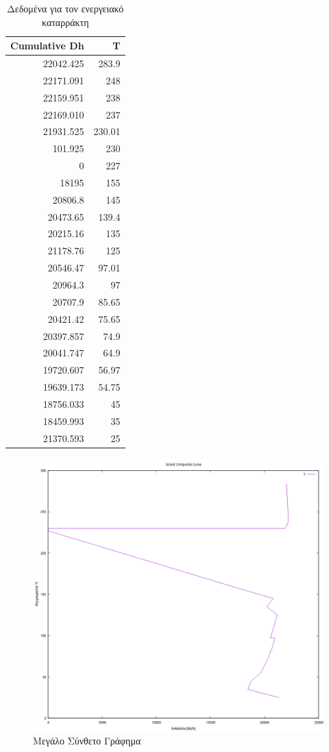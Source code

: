 \documentclass[11pt]{article}
\begin{document}
\begin{table}[htbp]
\caption{Δεδομένα για τον ενεργειακό καταρράκτη}
\centering
\begin{tabular}{rr}
Cumulative  Dh & T\\
\hline
22042.425 & 283.9\\
22171.091 & 248\\
22159.951 & 238\\
22169.010 & 237\\
21931.525 & 230.01\\
101.925 & 230\\
0 & 227\\
18195 & 155\\
20806.8 & 145\\
20473.65 & 139.4\\
20215.16 & 135\\
21178.76 & 125\\
20546.47 & 97.01\\
20964.3 & 97\\
20707.9 & 85.65\\
20421.42 & 75.65\\
20397.857 & 74.9\\
20041.747 & 64.9\\
19720.607 & 56.97\\
19639.173 & 54.75\\
18756.033 & 45\\
18459.993 & 35\\
21370.593 & 25\\
\end{tabular}
\end{table}

\begin{figure}[htbp]
\centering
\includegraphics[width=.9\linewidth]{Diagrams/grand_composite_curve.png}
\caption{Μεγάλο Σύνθετο Γράφημα}
\end{figure}
\end{document}
